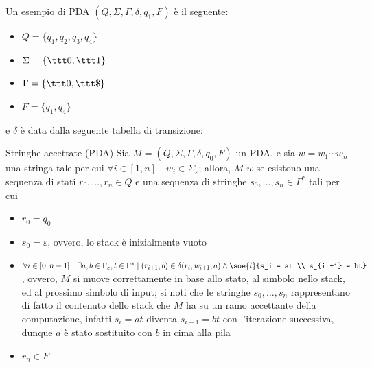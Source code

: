 \documentclass[a4paper, 12pt]{report}
\begin{document}
    \begin{example}[PDA]
        \label{pda ex}
        Un esempio di PDA $(Q, \Sigma, \Gamma, \delta, q_1, F)$ è il seguente:

        \begin{itemize}
            \item $Q = \{q_1, q_2, q_3, q_4\}$
            \item $\Sigma = \{ \ttt 0, \ttt 1 \}$
            \item $\Gamma = \{ \ttt 0, \ttt \$\}$
            \item $F = \{ q_1, q_4 \}$
        \end{itemize}

        e $\delta$ è data dalla seguente tabella di transizione:

    \end{example}

    \begin{frameddefn}{Stringhe accettate (PDA)}
        Sia $M = (Q, \Sigma, \Gamma, \delta, q_0, F)$ un PDA, e sia $w = w_1\cdots w_n$ una stringa tale per cui $\forall i \in [1, n] \quad w_i \in \Sigma_\varepsilon$; allora, $M$  $w$ se esistono una sequenza di stati $r_0, \ldots, r_n \in Q$ e una sequenza di stringhe $s_0, \ldots, s_n \in \Gamma ^*$ tali per cui

        \begin{itemize}
            \item $r_0 = q_0$
            \item $s_0 = \varepsilon$, ovvero, lo stack è inizialmente vuoto
            \item $\forall i \in [0, n - 1] \quad \exists a, b \in \Gamma_\varepsilon, t \in \Gamma^* \mid (r_{i + 1}, b) \in \delta(r_i, w_{i + 1}, a) \land \soe{l}{s_i = at \\ s_{i +1} = bt}$, ovvero, $M$ si muove correttamente in base allo stato, al simbolo nello stack, ed al prossimo simbolo di input; si noti che le stringhe $s_0, \ldots, s_n$ rappresentano di fatto il contenuto dello stack che $M$ ha su un ramo accettante della computazione, infatti $s_i = at$ diventa $s_{i + 1} = bt$ con l'iterazione successiva, dunque $a$ è stato sostituito con $b$ in cima alla pila
            \item $r_n \in F$
        \end{itemize}
    \end{frameddefn}
\end{document}
